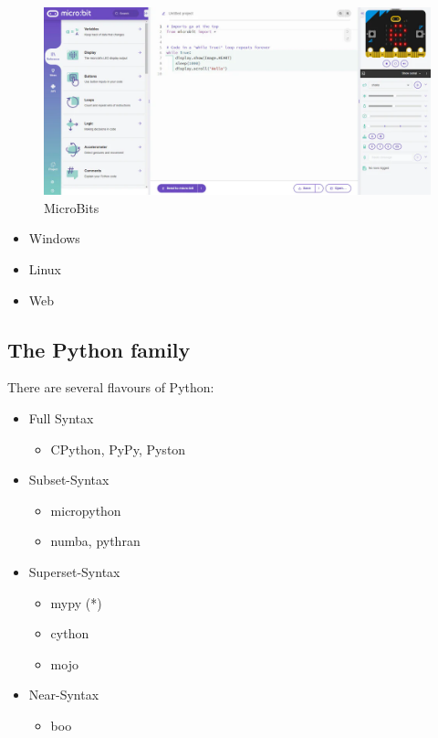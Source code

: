 \documentclass[
  letterpaper,
  DIV=11,
  numbers=noendperiod]{scrartcl}
\providecommand{\tightlist}{%
  \setlength{\itemsep}{0pt}\setlength{\parskip}{0pt}}\usepackage{longtable,booktabs,array}
\begin{document}
\begin{figure}[H]

{\centering \includegraphics{graphs/microbits.webp}

}

\caption{MicroBits}

\end{figure}%

\begin{itemize}
\item
  Windows
\item
  Linux
\item
  Web
\end{itemize}

\subsection{The Python family}\label{the-python-family}

There are several flavours of Python:

\begin{itemize}
\tightlist
\item
  Full Syntax

  \begin{itemize}
  \tightlist
  \item
    CPython, PyPy, Pyston
  \end{itemize}
\item
  Subset-Syntax

  \begin{itemize}
  \tightlist
  \item
    micropython
  \item
    numba, pythran
  \end{itemize}
\end{itemize}

\begin{itemize}
\tightlist
\item
  Superset-Syntax

  \begin{itemize}
  \tightlist
  \item
    mypy (*)
  \item
    cython
  \item
    mojo
  \end{itemize}
\item
  Near-Syntax

  \begin{itemize}
  \tightlist
  \item
    boo
  \end{itemize}
\end{itemize}
\end{document}
